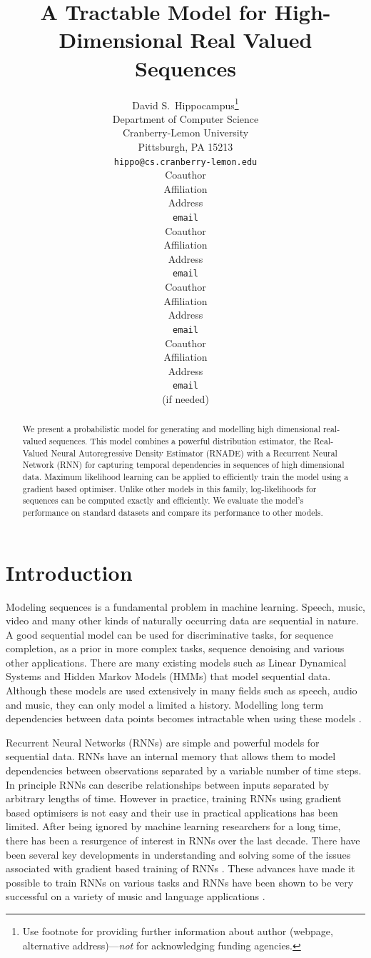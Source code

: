 \documentclass{article} %
\title{A Tractable Model for High-Dimensional Real Valued Sequences}
\author{
David S.~Hippocampus\thanks{ Use footnote for providing further information
about author (webpage, alternative address)---\emph{not} for acknowledging
funding agencies.} \\
Department of Computer Science\\
Cranberry-Lemon University\\
Pittsburgh, PA 15213 \\
\texttt{hippo@cs.cranberry-lemon.edu} \\
\And
Coauthor \\
Affiliation \\
Address \\
\texttt{email} \\
\AND
Coauthor \\
Affiliation \\
Address \\
\texttt{email} \\
\And
Coauthor \\
Affiliation \\
Address \\
\texttt{email} \\
\And
Coauthor \\
Affiliation \\
Address \\
\texttt{email} \\
(if needed)\\
}
\begin{document}
\maketitle

\begin{abstract}
We present a probabilistic model for generating and modelling high dimensional real-valued sequences. This model combines a powerful distribution estimator, the Real-Valued Neural Autoregressive Density Estimator (RNADE) with a Recurrent Neural Network (RNN) for capturing temporal dependencies in sequences of high dimensional data. Maximum likelihood learning can be applied to efficiently train the model using a gradient based optimiser. Unlike other models in this family, log-likelihoods for sequences can be computed exactly and efficiently. We evaluate the model's performance on standard datasets and compare its performance to other models. 
\end{abstract}

\section{Introduction}
\label{intro}
Modeling sequences is a fundamental problem in machine learning. Speech, music, video and many other kinds of naturally occurring data are sequential in nature. A good sequential model can be used for discriminative tasks, for sequence completion, as a prior in more complex tasks, sequence denoising and various other applications. There are many existing models such as Linear Dynamical Systems and Hidden Markov Models (HMMs) that model sequential data. Although these models are used extensively in many fields such as speech, audio and music, they can only model a limited a history. Modelling long term dependencies between data points becomes intractable when using these models \cite{sutskever2007learning}. 

Recurrent Neural Networks (RNNs) are simple and powerful models for sequential data. RNNs have an internal memory that allows them to model dependencies between observations separated by a variable number of time steps. In principle RNNs can describe relationships between inputs separated by arbitrary lengths of time. However in practice, training RNNs using gradient based optimisers is not easy and their use in practical applications has been limited. After being ignored by machine learning researchers for a long time, there has been a resurgence of interest in RNNs over the last decade. There have been several key developments in understanding and solving some of the issues associated with gradient based training of RNNs \cite{Martens2011,bengio2012advances}. These advances have made it possible to train RNNs on various tasks and RNNs have been shown to be very successful on a variety of music and language applications \cite{mikolov2011empirical,Boulanger-Lewandowski2012,bengio2012advances}. 
\end{document}
